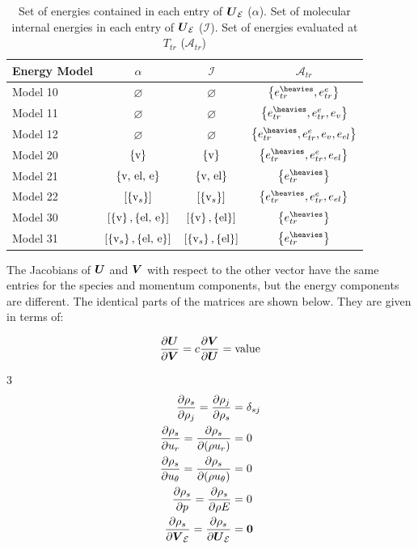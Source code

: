 \documentclass[10pt]{article}
\begin{document}
\begin{flushleft}
\begin{table}[h!]
\centering
\begin{tabular}{lccc}
\toprule
\textbf{Energy Model} & $\alpha$ & $\mathcal{I}$ & $\mathcal{A}_{tr}$  \\
\midrule
Model 10 & $\varnothing$ & $\varnothing$ & $\bcb{e_{tr}^{\heavies}, e_{tr}^e}$ \\
Model 11 & $\varnothing$ & $\varnothing$ & $\bcb{e_{tr}^{\heavies}, e_{tr}^e, e_v}$ \\
Model 12 & $\varnothing$ & $\varnothing$ & $\bcb{e_{tr}^{\heavies}, e_{tr}^e, e_v, e_{el}}$ \\
Model 20 & $\left\{ \text{v} \right\}$ & $\left\{ \text{v} \right\}$ & $\bcb{e_{tr}^{\heavies}, e_{tr}^e, e_{el}}$  \\
Model 21 & $\left\{ \text{v, el, e} \right\}$ & $\left\{ \text{v, el} \right\}$ & $\bcb{e_{tr}^{\heavies}}$ \\
Model 22 & $\left[ \left\{ \text{v}_s \right\} \right]$ & $\left[ \left\{ \text{v}_s \right\} \right]$ & $\bcb{e_{tr}^{\heavies}, e_{tr}^e, e_{el}}$ \\
Model 30 & $\left[ \left\{ \text{v} \right\}, \left\{ \text{el, e} \right\} \right]$ & $\left[ \left\{ \text{v} \right\}, \left\{ \text{el} \right\} \right]$ & $\bcb{e_{tr}^{\heavies}}$  \\
Model 31 & $\left[ \left\{ \text{v}_s \right\}, \left\{ \text{el, e} \right\} \right]$ & $\left[ \left\{ \text{v}_s \right\}, \left\{ \text{el} \right\} \right]$ & $\bcb{e_{tr}^{\heavies}}$ \\
\bottomrule
\end{tabular}
\caption{Set of energies contained in each entry of $\boldsymbol{U}_{\mathcal{E}}$ ($\alpha$). Set of molecular internal energies in each entry of $\boldsymbol{U}_{\mathcal{E}}$ ($\mathcal{I}$). Set of energies evaluated at $T_{tr}$ ($\mathcal{A}_{tr}$)}
\label{tab:UV-Extra-Components}
\end{table}

The Jacobians of $\boldsymbol{U}$ and $\boldsymbol{V}$ with respect to the other vector have the same entries for the species and momentum components, but the energy components are different. The identical parts of the matrices are shown below. They are given in terms of:

\begin{equation*}
    \frac{\partial \boldsymbol{U}}{\partial \boldsymbol{V}} = c \frac{\partial \boldsymbol{V}}{\partial \boldsymbol{U}} = \text{value}
\end{equation*}

\begin{multicols}{3}
    \begin{align*}
        \frac{\partial \rho_s}{\partial \rho_j} = \frac{\partial \rho_j}{\partial \rho_s} &= \delta_{sj} \\
        \frac{\partial \rho_s}{\partial u_r} = \frac{\partial \rho_s}{\partial (\rho u_r)} &= 0 \\
        \frac{\partial \rho_s}{\partial u_\theta} = \frac{\partial \rho_s}{\partial (\rho u_\theta)} &= 0 \\
        \frac{\partial \rho_s}{\partial p} = \frac{\partial \rho_s}{\partial \rho E} &= 0 \\
        \frac{\partial \rho_s}{\partial \boldsymbol{V}_{\mathcal{E}}} = \frac{\partial \rho_s}{\partial \boldsymbol{U}_{\mathcal{E}}} &= \boldsymbol{0}
    \end{align*}


\end{multicols}
\end{flushleft}
\end{document}
